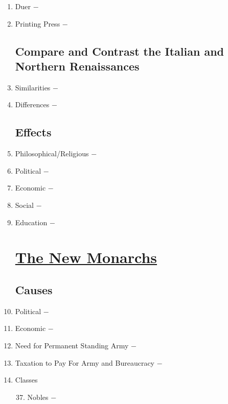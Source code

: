 \documentclass[12pt]{article}
\begin{document}
\begin{enumerate}
\item Duer $-$

\item Printing Press $-$ 

\subsection{Compare and Contrast the Italian and Northern Renaissances}

\item Similarities $-$

\item Differences $-$

\subsection{Effects}

\item Philosophical/Religious $-$

\item Political $-$

\item Economic $-$

\item Social $-$

\item Education $-$ 

\begin{center}
\section{\underline{The New Monarchs}}
\end{center}

\subsection{Causes}

\item Political $-$

\item Economic $-$ 

\item Need for Permanent Standing Army $-$

\item Taxation to Pay For Army and Bureaucracy $-$

\item Classes
\begin{enumerate}[label=\arabic{*}.]
\setcounter{enumii}{36}
\item Nobles $-$


\end{enumerate}
\end{enumerate}
\end{document}
